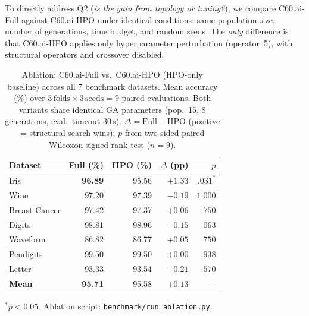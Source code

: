 \documentclass{article}
\theoremstyle{definition}
\theoremstyle{plain}
\theoremstyle{remark}
\begin{document}
To directly address Q2 (\emph{is the gain from topology or tuning?}), we
compare C60.ai-Full against C60.ai-HPO under identical conditions:
same population size, number of generations, time budget, and random seeds.
The \emph{only} difference is that C60.ai-HPO applies only hyperparameter
perturbation (operator~5), with structural operators and crossover disabled.

\begin{table}[t]
  \caption{%
    Ablation: C60.ai-Full vs.\ C60.ai-HPO (HPO-only baseline) across all
    7 benchmark datasets.
    Mean accuracy (\%) over $3\,\text{folds} \times 3\,\text{seeds} = 9$
    paired evaluations.
    Both variants share identical GA parameters (pop.\ 15, 8 generations,
    eval.\ timeout 30\,s).
    $\Delta = \text{Full} - \text{HPO}$ (positive = structural search wins);
    $p$ from two-sided paired Wilcoxon signed-rank test ($n{=}9$).%
  }
  \label{tab:ablation}
  \vskip 0.05in
  \begin{center}
    \begin{small}
      \begin{tabular}{lrrrr}
        \toprule
        Dataset       & Full (\%)        & HPO (\%)  & $\Delta$ (pp) & $p$ \\
        \midrule
        Iris          & \textbf{96.89}   & 95.56     & $+1.33$       & $.031^{*}$ \\
        Wine          & 97.20            & 97.39     & $-0.19$       & $1.000$    \\
        Breast Cancer & 97.42            & 97.37     & $+0.06$       & $.750$     \\
        Digits        & 98.81            & 98.96     & $-0.15$       & $.063$     \\
        Waveform      & 86.82            & 86.77     & $+0.05$       & $.750$     \\
        Pendigits     & 99.50            & 99.50     & $+0.00$       & $.938$     \\
        Letter        & 93.33            & 93.54     & $-0.21$       & $.570$     \\
        \midrule
        \textbf{Mean} & \textbf{95.71}   & 95.58     & $+0.13$       & ---        \\
        \bottomrule
      \end{tabular}
    \end{small}
  \end{center}
  \begin{flushleft}
    \footnotesize $^{*}p < 0.05$.
    Ablation script: \texttt{benchmark/run\_ablation.py}.
  \end{flushleft}
  \vskip -0.1in
\end{table}
\end{document}
